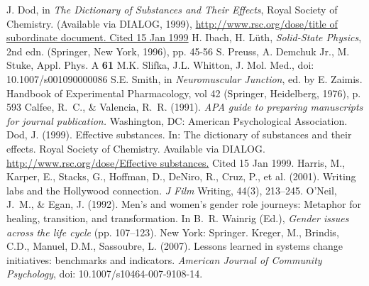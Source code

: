 \documentclass[graybox,envcountchap,sectrefs]{svmono}
\begin{document}
\begin{thebibliography}{99.}
	 J. Dod, in \textit{The Dictionary of Substances and Their Effects}, Royal Society of Chemistry. (Available via DIALOG, 1999), 
	\url{http://www.rsc.org/dose/title of subordinate document. Cited 15 Jan 1999}
	 H. Ibach, H. L\"uth, \textit{Solid-State Physics}, 2nd edn. (Springer, New York, 1996), pp. 45-56 
	 S. Preuss, A. Demchuk Jr., M. Stuke, Appl. Phys. A \textbf{61}
	 M.K. Slifka, J.L. Whitton, J. Mol. Med., doi: 10.1007/s001090000086
	 S.E. Smith, in \textit{Neuromuscular Junction}, ed. by E. Zaimis. Handbook of Experimental Pharmacology, vol 42 (Springer, Heidelberg, 1976), p. 593
	\bigskip
	 Calfee, R.~C., \& Valencia, R.~R. (1991). \textit{APA guide to preparing manuscripts for journal publication.} Washington, DC: American Psychological Association.
	 Dod, J. (1999). Effective substances. In: The dictionary of substances and their effects. Royal Society of Chemistry. Available via DIALOG. \\
	\url{http://www.rsc.org/dose/Effective substances.} Cited 15 Jan 1999.
	 Harris, M., Karper, E., Stacks, G., Hoffman, D., DeNiro, R., Cruz, P., et al. (2001). Writing labs and the Hollywood connection. \textit{J Film} Writing, 44(3), 213--245.
	 O'Neil, J.~M., \& Egan, J. (1992). Men's and women's gender role journeys: Metaphor for healing, transition, and transformation. In B.~R. Wainrig (Ed.), \textit{Gender issues across the life cycle} (pp. 107--123). New York: Springer.
	Kreger, M., Brindis, C.D., Manuel, D.M., Sassoubre, L. (2007). Lessons learned in systems change initiatives: benchmarks and indicators. \textit{American Journal of Community Psychology}, doi: 10.1007/s10464-007-9108-14.
	\bigskip

\end{thebibliography}
\end{document}
